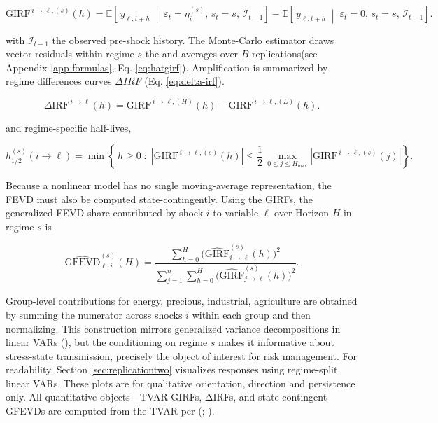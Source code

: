\documentclass[
  11pt,
]{article}
\begin{document}
\begin{equation}\label{eq:girf}
\mathrm{GIRF}^{\,i \to \ell,(s)}(h)
=
\mathbb{E}\!\left[\, y_{\ell,t+h} \;\middle|\; \varepsilon_t=\eta_i^{(s)},\, s_t=s,\, \mathcal{I}_{t-1} \right]
-
\mathbb{E}\!\left[\, y_{\ell,t+h} \;\middle|\; \varepsilon_t=0,\, s_t=s,\, \mathcal{I}_{t-1} \right].
\end{equation}

with \(\mathcal{I}_{t-1}\) the observed pre-shock history. The Monte-Carlo estimator draws vector residuals within regime \(s\) the and averages over \(B\) replications(see Appendix \ref{app-formulas}, Eq. \eqref{eq:hatgirf}). Amplification is summarized by regime differences curves \(\Delta IRF\) (Eq. \eqref{eq:delta-irf}).

\begin{equation}\label{eq:delta-irf}
\Delta \mathrm{IRF}^{\,i \to \ell}(h)
=
\mathrm{GIRF}^{\,i \to \ell,(H)}(h)
-
\mathrm{GIRF}^{\,i \to \ell,(L)}(h).
\end{equation}

and regime-specific half-lives,

\begin{equation}\label{eq:h-1-2}
h_{1/2}^{(s)}(i \to \ell)
=
\min\left\{\, h \ge 0 \;:\;
\left|\mathrm{GIRF}^{\,i \to \ell,(s)}(h)\right|
\le
\frac{1}{2}\,
\max_{0 \le j \le H_{\max}}
\left|\mathrm{GIRF}^{\,i \to \ell,(s)}(j)\right|
\right\}.
\end{equation}

Because a nonlinear model has no single moving-average representation, the FEVD must also be computed state-contingently. Using the GIRFs, the generalized FEVD share contributed by shock \(i\) to variable \(\ell\) over Horizon \(H\) in regime \(s\) is

\begin{equation}\label{eq:gfevd}
\widehat{\mathrm{GFEVD}}_{\ell,i}^{(s)}(H)
=
\frac{\sum_{h=0}^{H} \bigl(\widehat{\mathrm{GIRF}}_{i \to \ell}^{(s)}(h)\bigr)^2}
     {\sum_{j=1}^{n}\sum_{h=0}^{H} \bigl(\widehat{\mathrm{GIRF}}_{j \to \ell}^{(s)}(h)\bigr)^2}.
\end{equation}

Group-level contributions for energy, precious, industrial, agriculture are obtained by summing the numerator across shocks \(i\) within each group and then normalizing. This construction mirrors generalized variance decompositions in linear VARs (), but the conditioning on regime \(s\) makes it informative about stress-state transmission, precisely the object of interest for risk management. For readability, Section \ref{sec:replicationtwo} visualizes responses using regime‑split linear VARs. These plots are for qualitative orientation, direction and persistence only. All quantitative objects---TVAR GIRFs, ΔIRFs, and state‑contingent GFEVDs are computed from the TVAR per (; ).
\end{document}
